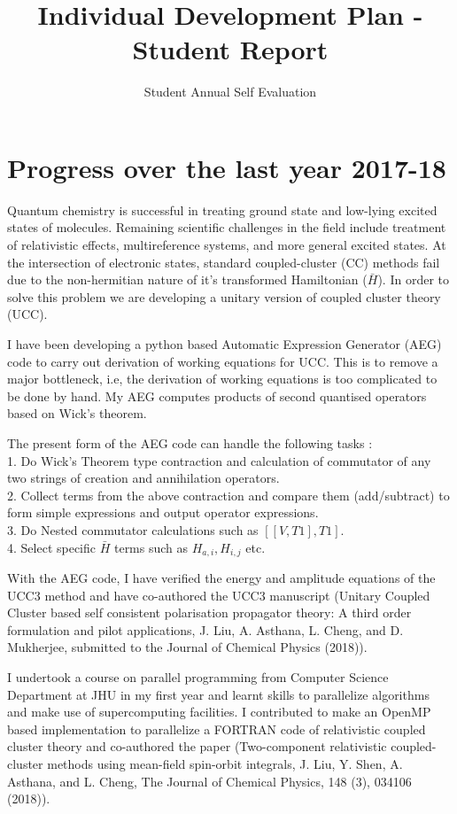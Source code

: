 \documentclass[11pt]{article}   	%
\begin{document}
\title{Individual Development Plan - Student Report}
\author{Student Annual Self Evaluation}

\maketitle

\section{Progress over the last year 2017-18}%
Quantum chemistry is successful in treating ground state and low-lying excited states of molecules. Remaining scientific challenges in the field include treatment of relativistic effects, multireference systems, and more general excited states. At the intersection of electronic states, standard coupled-cluster (CC) methods fail due to the non-hermitian nature of it's transformed Hamiltonian ($\bar{H}$). In order to solve this problem we are developing a unitary version of coupled cluster theory (UCC).

I have been developing a python based Automatic Expression Generator (AEG) code to carry out derivation of working equations for UCC. This is to remove a major bottleneck, i.e, the derivation of working equations is too complicated to be done by hand. My AEG computes products of second quantised operators based on Wick's theorem.

The present form of the AEG code can handle the following tasks : \\
1. Do Wick's Theorem type contraction and calculation of commutator of any two strings of creation and annihilation operators. \\
2. Collect terms from the above contraction and compare them (add/subtract) to form simple expressions and output operator expressions.\\
3. Do Nested commutator calculations such as $[[V,T1],T1]$.\\
4. Select specific $\bar{H}$ terms such as $H_{a,i}, H_{i,j}$ etc.  

With the AEG code, I have verified the energy and amplitude equations of the UCC3 method and have co-authored the UCC3 manuscript (Unitary Coupled Cluster based self consistent polarisation propagator theory: A third order formulation and pilot applications, J. Liu, A. Asthana, L. Cheng, and D. Mukherjee, submitted to the Journal of Chemical Physics (2018)).

I undertook a course on parallel programming from Computer Science Department at JHU in my first year and learnt skills to parallelize algorithms and make use of supercomputing facilities. I contributed to make an OpenMP based implementation to parallelize a FORTRAN code of relativistic coupled cluster theory and co-authored the paper (Two-component relativistic coupled-cluster methods using mean-field spin-orbit integrals, J. Liu, Y. Shen, A. Asthana, and L. Cheng, The Journal of Chemical Physics, 148 (3), 034106 (2018)).
\end{document}
